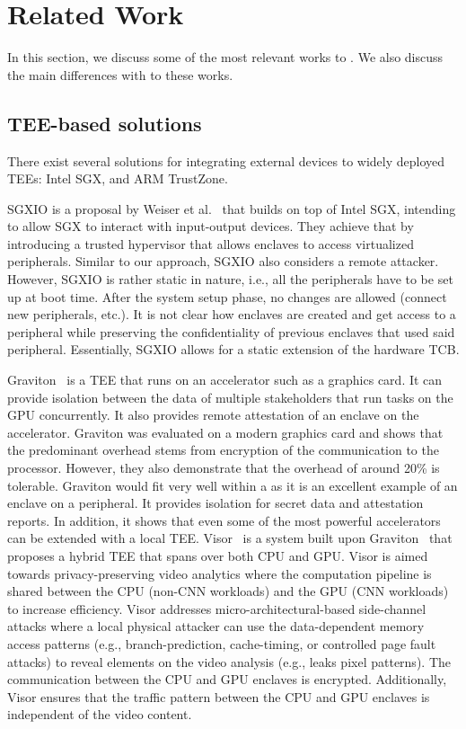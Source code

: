 \section{Related Work}
\label{sec:relatedWork}

In this section, we discuss some of the most relevant works to \name. We also discuss the main differences with \name to these works.


\subsection{TEE-based solutions}
There exist several solutions for integrating external devices to widely deployed TEEs: Intel SGX, and ARM TrustZone. 

 SGXIO is a proposal by Weiser et al.~\cite{weiser2017sgxio} that builds on top of Intel SGX, intending to allow SGX to interact with input-output devices. They achieve that by introducing a trusted hypervisor that allows enclaves to access virtualized peripherals. Similar to our approach, SGXIO also considers a remote attacker. However, SGXIO is rather static in nature, i.e., all the peripherals have to be set up at boot time. After the system setup phase, no changes are allowed (connect new peripherals, etc.). It is not clear how enclaves are created and get access to a peripheral while preserving the confidentiality of previous enclaves that used said peripheral. Essentially, SGXIO allows for a static extension of the hardware TCB.

 Graviton~\cite{volos2018graviton} is a TEE that runs on an accelerator such as a graphics card. It can provide isolation between the data of multiple stakeholders that run tasks on the GPU concurrently. It also provides remote attestation of an enclave on the accelerator. Graviton was evaluated on a modern graphics card and shows that the predominant overhead stems from encryption of the communication to the processor. However, they also demonstrate that the overhead of around 20\% is tolerable. Graviton would fit very well within a \name{} as it is an excellent example of an enclave on a peripheral. It provides isolation for secret data and attestation reports. In addition, it shows that even some of the most powerful accelerators can be extended with a local TEE. Visor~\cite{visor} is a system built upon Graviton~\cite{volos2018graviton} that proposes a hybrid TEE that spans over both CPU and GPU. Visor is aimed towards privacy-preserving video analytics where the computation pipeline is shared between the CPU (non-CNN workloads) and the GPU (CNN workloads) to increase efficiency. Visor addresses micro-architectural-based side-channel attacks where a local physical attacker can use the data-dependent memory access patterns (e.g., branch-prediction, cache-timing, or controlled page fault attacks) to reveal elements on the video analysis (e.g., leaks pixel patterns). The communication between the CPU and GPU enclaves is encrypted. Additionally, Visor ensures that the traffic pattern between the CPU and GPU enclaves is independent of the video content.

